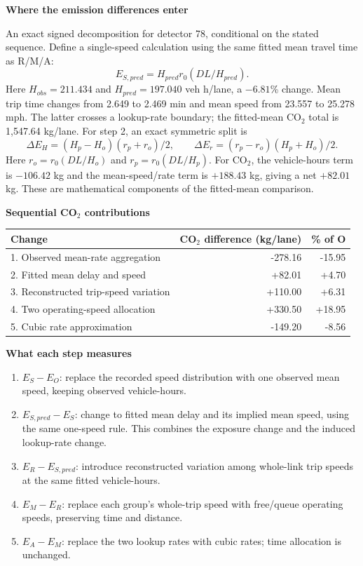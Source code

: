 \newpage
{\fontsize{18}{21}\selectfont\bfseries\color{navy}Where the emission differences enter}\par
{\color{muted}An exact signed decomposition for detector 78, conditional on the stated sequence.}
\vspace{8pt}
Define a single-speed calculation using the same fitted mean travel time as R/M/A:
\[
E_{S,pred}=H_{pred}r_0(DL/H_{pred}).
\]
Here $H_{obs}=211.434$ and $H_{pred}=197.040$ veh h/lane, a $-6.81$\% change.
Mean trip time changes from 2.649 to 2.469 min and mean speed from 23.557 to 25.278 mph.
The latter crosses a lookup-rate boundary; the fitted-mean CO$_2$ total is 1,547.64 kg/lane.
For step 2, an exact symmetric split is
\[
\Delta E_H=(H_p-H_o)(r_p+r_o)/2,\qquad
\Delta E_r=(r_p-r_o)(H_p+H_o)/2.
\]
Here $r_o=r_0(DL/H_o)$ and $r_p=r_0(DL/H_p)$.
For CO$_2$, the vehicle-hours term is $-106.42$ kg and the mean-speed/rate term is $+188.43$ kg,
giving a net $+82.01$ kg. These are mathematical components of the fitted-mean comparison.

\vspace{8pt}\textbf{Sequential CO$_2$ contributions}\par
\renewcommand{\arraystretch}{1.45}\setlength{\tabcolsep}{6pt}
\begin{tabular*}{\linewidth}{@{\extracolsep{\fill}}lrr@{}}\toprule
Change & CO$_2$ difference (kg/lane) & \% of O\\\midrule
1. Observed mean-rate aggregation & -278.16 & -15.95 \\
2. Fitted mean delay and speed & +82.01 & +4.70 \\
3. Reconstructed trip-speed variation & +110.00 & +6.31 \\
4. Two operating-speed allocation & +330.50 & +18.95 \\
5. Cubic rate approximation & -149.20 & -8.56 \\
\bottomrule\end{tabular*}

\vspace{8pt}\textbf{What each step measures}
\begin{enumerate}\setlength{\itemsep}{3pt}
\item $E_S-E_O$: replace the recorded speed distribution with one observed mean speed, keeping observed vehicle-hours.
\item $E_{S,pred}-E_S$: change to fitted mean delay and its implied mean speed, using the same one-speed rule.
This combines the exposure change and the induced lookup-rate change.
\item $E_R-E_{S,pred}$: introduce reconstructed variation among whole-link trip speeds at the same fitted vehicle-hours.
\item $E_M-E_R$: replace each group's whole-trip speed with free/queue operating speeds, preserving time and distance.
\item $E_A-E_M$: replace the two lookup rates with cubic rates; time allocation is unchanged.
\end{enumerate}

